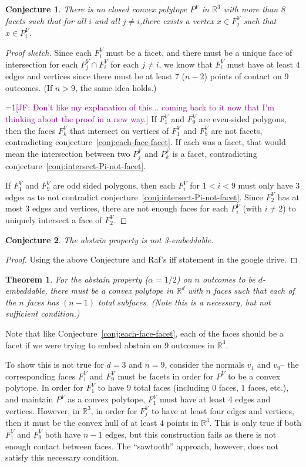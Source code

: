 \documentclass[12pt]{article}
\newcommand{\Comments}{1}
\newcommand{\mynote}[2]{\ifnum\Comments=1\textcolor{#1}{#2}\fi}
\newcommand{\jessie}[1]{\mynote{purple}{[JF: #1]}}
\newcommand{\reals}{\mathbb{R}}
\newtheorem{theorem}{Theorem}
\newtheorem{conjecture}{Conjecture}
\begin{document}
\begin{conjecture}
	There is no closed convex polytope $P^V$ in $\reals^3$ with more than 8 facets such that for all $i$ and all $j \neq i$,there exists a vertex $x \in F_j^V$ such that $x \in P^V_i$.
\end{conjecture}
\begin{proof}[Proof sketch]
	Since each $F_i^V$ must be a facet, and there must be a unique face of intersection for each $P_j^V \cap F_i^V$ for each $j \neq i$, we know that $F_i^V$ must have at least 4 edges and vertices since there must be at least 7 ($n-2$) points of contact on 9 outcomes. 
	(If $n > 9$, the same idea holds.)
	
	\jessie{Don't like my explanation of this... coming back to it now that I'm thinking about the proof in a new way.}
	If $F_1^V$ and $F_9^V$ are even-sided polygons, then the faces $F_k^V$ that intersect on vertices of $F_1^V$ and $F_9^V$ are not facets, contradicting conjecture~\ref{conj:each-face-facet}.
	If each was a facet, that would mean the intersection between two $P_j^V$ and $P_k^V$ is a facet, contradicting conjecture~\ref{conj:intersect-Pi-not-facet}.
	
	If $F_1^V$ and $F_9^V$ are odd sided polygons, then each $F_i^V$ for $1 < i < 9$ must only have 3 edges as to not contradict conjecture~\ref{conj:intersect-Pi-not-facet}.
	Since $F_2^V$ has at most 3 edges and vertices, there are not enough faces for each $P_i^V$ (with $i \neq 2$) to uniquely intersect a face of $F_2^V$.
\end{proof}

\begin{conjecture}
	The abstain property is not 3-embeddable.
\end{conjecture}
\begin{proof}
	Using the above Conjecture and Raf's iff statement in the google drive.
\end{proof}

\newpage
\begin{theorem}
	For the abstain property ($\alpha = 1/2$) on $n$ outcomes to be $d$-embeddable, there must be a convex polytope in $\reals^d$ with $n$ faces such that each of the $n$ faces has $(n-1)$ total subfaces.
	(Note this is a necessary, but not sufficient condition.)
\end{theorem}

Note that like Conjecture~\ref{conj:each-face-facet}, each of the faces should be a facet if we were trying to embed abstain on 9 outcomes in $\reals^3$.

To show this is not true for $d=3$ and $n=9$, consider the normals $v_1$ and $v_9$-- the corresponding faces $F^V_1$ and $F_9^V$ must be facets in order for $P^V$ to be a convex polytope.
In order for $F_1^V$ to have $9$ total faces (including $0$ faces, $1$ faces, etc.), and maintain $P^V$ as a convex polytope, $F_1^V$ must have at least 4 edges and vertices.
However, in $\reals^3$, in order for $F_j^V$ to have at least four edges and vertices, then it must be the convex hull of at least $4$ points in $\reals^3$.
This is only true if both $F^V_1$ and $F_9^V$ both have $n-1$ edges, but this construction fails as there is not enough contact between faces.
The ``sawtooth'' approach, however, does not satisfy this necessary condition.
\end{document}
